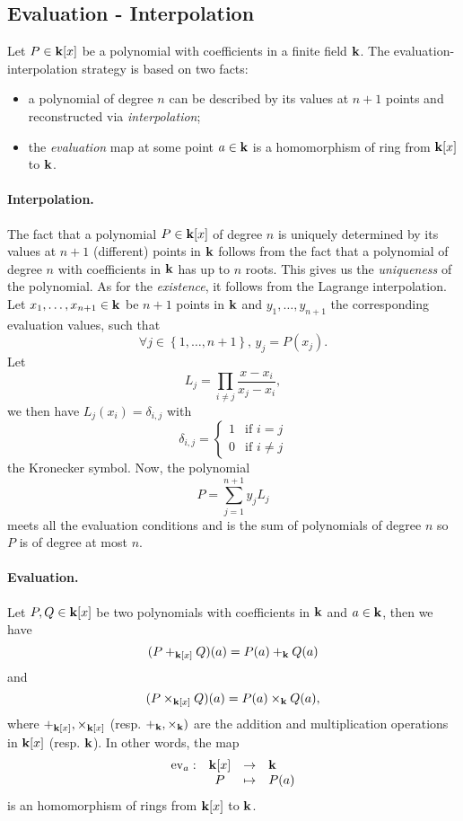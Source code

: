 \subsection{Evaluation - Interpolation}
\label{sec:evalinter}

Let $P\in\mathbf{k}[x]$ be a polynomial with coefficients in a finite field $\mathbf{k}$. The
evaluation-interpolation strategy is based on two facts:
\begin{itemize}
  \item a polynomial of degree $n$ can be described by its values at $n+1$
    points and reconstructed via \emph{interpolation};
  \item the \emph{evaluation} map at some point $a\in\mathbf{k}$ is a homomorphism of ring from
    $\mathbf{k}[x]$ to $\mathbf{k}$.
\end{itemize}
\paragraph{Interpolation.} The fact that a polynomial $P\in\mathbf{k}[x]$ of degree $n$
is uniquely determined by its values at $n+1$ (different) points in $\mathbf{k}$ follows
from the fact that a polynomial of degree $n$ with coefficients in $\mathbf{k}$ has up
to $n$ roots. This gives us the \emph{uniqueness} of the polynomial. As for the
\emph{existence}, it follows from the Lagrange interpolation. Let $x_1, \dots,
x_{n+1}\in\mathbf{k}$ be $n+1$ points in $\mathbf{k}$ and $y_1, \dots, y_{n+1}$ the
corresponding evaluation values, such that
\[
  \forall j\in\left\{ 1, \dots, n+1 \right\},\,y_j = P(x_j).
\]
Let 
\[
  L_j = \prod_{i\neq j}\frac{x-x_i}{x_j-x_i},
\]
we then have $L_j(x_i) = \delta_{i, j}$ with
\[
  \delta_{i, j} = 
  \left\{\begin{array}{ll}
      1&\mbox{if } i=j\\
      0&\mbox{if } i\neq j
    \end{array}
    \right.
\]
the Kronecker symbol. Now, the polynomial
\[
  P = \sum_{j=1}^{n+1} y_j L_j
\]
meets all the evaluation conditions and is the sum of polynomials of degree $n$
so $P$ is of degree at most $n$.

\paragraph{Evaluation.} Let $P, Q\in\mathbf{k}[x]$ be two polynomials with coefficients
in $\mathbf{k}$ and $a\in\mathbf{k}$, then we have
\[
  (P+_{\mathbf{k}[x]}Q)(a) = P(a) +_{\mathbf{k}} Q(a)
\]
and 
\[
  (P\times_{\mathbf{k}[x]} Q)(a) = P(a) \times_{\mathbf{k}} Q(a),
\]
where $+_{\mathbf{k}[x]}, \times_{\mathbf{k}[x]}$ (resp. $+_{\mathbf{k}}, \times_{\mathbf{k}})$ are the addition
and multiplication operations in $\mathbf{k}[x]$ (resp. $\mathbf{k}$).
In other words, the map
\[
\begin{array}{lccl}
  \textrm{ev}_a:&\mathbf{k}[x]&\to&\mathbf{k}\\
  &P&\mapsto&P(a)
\end{array}
\]
is an homomorphism of rings from $\mathbf{k}[x]$ to $\mathbf{k}$.

